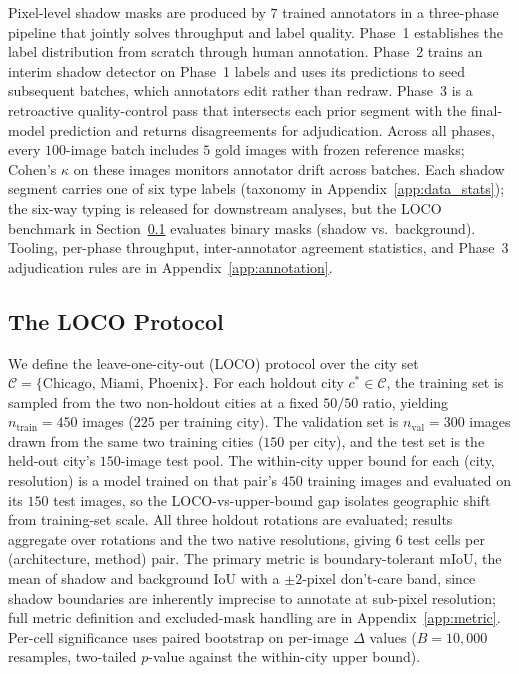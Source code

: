 Pixel-level shadow masks are produced by $7$ trained annotators in a three-phase pipeline that jointly solves throughput and label quality. Phase~1 establishes the label distribution from scratch through human annotation. Phase~2 trains an interim shadow detector on Phase~1 labels and uses its predictions to seed subsequent batches, which annotators edit rather than redraw. Phase~3 is a retroactive quality-control pass that intersects each prior segment with the final-model prediction and returns disagreements for adjudication. Across all phases, every $100$-image batch includes $5$ gold images with frozen reference masks; Cohen's $\kappa$ on these images monitors annotator drift across batches. Each shadow segment carries one of six type labels (taxonomy in Appendix~\ref{app:data_stats}); the six-way typing is released for downstream analyses, but the LOCO benchmark in Section~\ref{sec:loco} evaluates binary masks (shadow vs.\ background). Tooling, per-phase throughput, inter-annotator agreement statistics, and Phase~3 adjudication rules are in Appendix~\ref{app:annotation}.



\subsection{The LOCO Protocol}
\label{sec:loco}

We define the leave-one-city-out (LOCO) protocol over the city set $\mathcal{C} = \{\text{Chicago, Miami, Phoenix}\}$. For each holdout city $c^* \in \mathcal{C}$, the training set is sampled from the two non-holdout cities at a fixed $50/50$ ratio, yielding $n_{\text{train}} = 450$ images ($225$ per training city). The validation set is $n_{\text{val}} = 300$ images drawn from the same two training cities ($150$ per city), and the test set is the held-out city's $150$-image test pool. The within-city upper bound for each (city, resolution) is a model trained on that pair's $450$ training images and evaluated on its $150$ test images, so the LOCO-vs-upper-bound gap isolates geographic shift from training-set scale. All three holdout rotations are evaluated; results aggregate over rotations and the two native resolutions, giving $6$ test cells per (architecture, method) pair. The primary metric is boundary-tolerant mIoU, the mean of shadow and background IoU with a $\pm 2$-pixel don't-care band, since shadow boundaries are inherently imprecise to annotate at sub-pixel resolution; full metric definition and excluded-mask handling are in Appendix~\ref{app:metric}. Per-cell significance uses paired bootstrap on per-image $\Delta$ values ($B = 10{,}000$ resamples, two-tailed $p$-value against the within-city upper bound).


